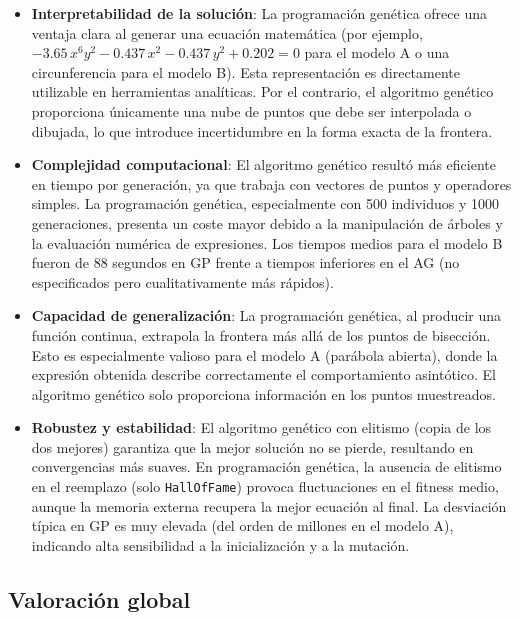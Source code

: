 \documentclass{article}
\begin{document}
\begin{itemize}
    \item \textbf{Interpretabilidad de la solución}: La programación genética ofrece una ventaja clara al generar una ecuación matemática (por ejemplo, $-3.65\,x^6y^2 - 0.437\,x^2 - 0.437\,y^2 + 0.202 = 0$ para el modelo A o una circunferencia para el modelo B). Esta representación es directamente utilizable en herramientas analíticas. Por el contrario, el algoritmo genético proporciona únicamente una nube de puntos que debe ser interpolada o dibujada, lo que introduce incertidumbre en la forma exacta de la frontera.

    \item \textbf{Complejidad computacional}: El algoritmo genético resultó más eficiente en tiempo por generación, ya que trabaja con vectores de puntos y operadores simples. La programación genética, especialmente con 500 individuos y 1000 generaciones, presenta un coste mayor debido a la manipulación de árboles y la evaluación numérica de expresiones. Los tiempos medios para el modelo B fueron de 88 segundos en GP frente a tiempos inferiores en el AG (no especificados pero cualitativamente más rápidos).

    \item \textbf{Capacidad de generalización}: La programación genética, al producir una función continua, extrapola la frontera más allá de los puntos de bisección. Esto es especialmente valioso para el modelo A (parábola abierta), donde la expresión obtenida describe correctamente el comportamiento asintótico. El algoritmo genético solo proporciona información en los puntos muestreados.

    \item \textbf{Robustez y estabilidad}: El algoritmo genético con elitismo (copia de los dos mejores) garantiza que la mejor solución no se pierde, resultando en convergencias más suaves. En programación genética, la ausencia de elitismo en el reemplazo (solo \texttt{HallOfFame}) provoca fluctuaciones en el fitness medio, aunque la memoria externa recupera la mejor ecuación al final. La desviación típica en GP es muy elevada (del orden de millones en el modelo A), indicando alta sensibilidad a la inicialización y a la mutación.
\end{itemize}

\subsection{Valoración global}
\end{document}
